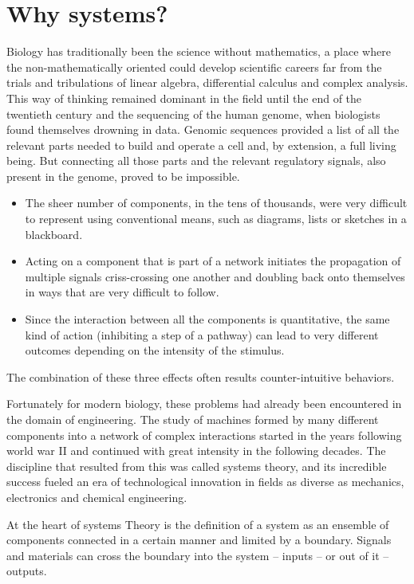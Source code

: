 \section{Why systems?}

Biology has traditionally been the science without mathematics, a place where the non-mathematically oriented  could develop  scientific careers far from the trials and tribulations of linear algebra, differential calculus and complex analysis. This way of thinking remained dominant in the field until the end of the twentieth century and the sequencing of the human genome, when biologists found themselves drowning in data. Genomic sequences provided a list of all the relevant parts needed to build and operate a cell and, by extension, a full living being. But connecting all those parts and the relevant regulatory signals, also present in the genome, proved to be impossible.\begin{itemize}
	\item The sheer number of components, in the tens of thousands, were very difficult to represent using conventional means, such as diagrams, lists or sketches in a blackboard.
	\item Acting on a component that is part of a network initiates the propagation of multiple signals criss-crossing one another and doubling back onto themselves in ways that are very difficult to follow.
	\item Since the interaction between all the components is quantitative, the same kind of action (inhibiting a step of a pathway) can lead to very different outcomes depending on the intensity of the stimulus.
\end{itemize}    

The combination of these three effects often results counter-intuitive behaviors.

Fortunately for modern biology, these problems had already been encountered in the domain of engineering. The study of machines formed by many different components into a network of complex interactions started in the years following world war II and continued with great intensity in the following decades. The discipline that resulted from this was called systems theory, and its incredible success fueled an era of technological innovation in fields as diverse as mechanics, electronics and chemical engineering.

At the heart of systems Theory is the definition of a system as an ensemble of components connected in a certain manner and limited by a boundary. Signals and materials can cross the boundary into the system -- inputs -- or out of it -- outputs.

